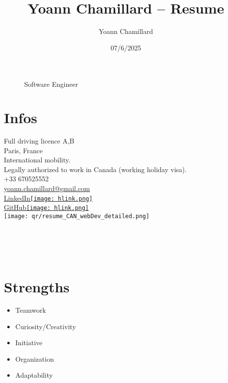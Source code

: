 \documentclass[]{friggeri-cv}
\title{Yoann Chamillard -- Resume}
\author{Yoann Chamillard}
\date{07/6/2025}
\begin{document}
      {~~~~~~Software Engineer}
      {}

\begin{aside}
\vspace{21mm}
\section{Infos}

Full driving licence A,B\\
\vspace{2.5mm}
Paris, France\\
\vspace{1.5mm}
International mobility.\\
\vspace*{0.6mm}Legally authorized to work in Canada (working holiday visa).\\
\vspace{2.5mm}
+33 670525552\\
\href{mailto:yoann.chamillard@gmail.com}{\small yoann.chamillard@gmail.com}\\
\vspace{2.5mm}
\href{https://www.linkedin.com/in/yoannchamillard/?locale=en_US}{LinkedIn\hspace{1.5mm}\texttt{[image: hlink.png]}}\\
\href{https://github.com/Nokheenig?tab=stars}{GitHub\hspace{1.5mm}\texttt{[image: hlink.png]}}\\
\vspace{2.5mm}
\texttt{[image: qr/resume\_CAN\_webDev\_detailed.png]}\\
\vspace{2.5mm}
\\
\\
\\
\\
\vspace{2.5mm}%

\section{Strengths}
\begin{itemize}
\item Teamwork
\item Curiosity/Creativity
\item Initiative
\item Organization
\item Adaptability
\end{itemize}

\end{aside}
\end{document}
